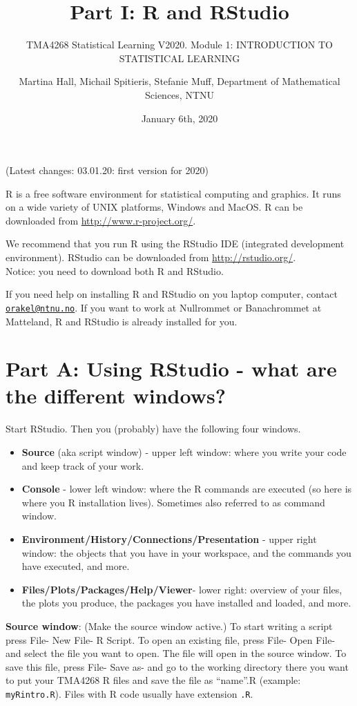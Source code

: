 \documentclass[]{article}
\title{Part I: R and RStudio}
\subtitle{TMA4268 Statistical Learning V2020. Module 1: INTRODUCTION TO
STATISTICAL LEARNING}
\author{Martina Hall, Michail Spitieris, Stefanie Muff, Department of
Mathematical Sciences, NTNU}
\date{January 6th, 2020}
\begin{document}
\maketitle

(Latest changes: 03.01.20: first version for 2020)

R is a free software environment for statistical computing and graphics.
It runs on a wide variety of UNIX platforms, Windows and MacOS. R can be
downloaded from \url{http://www.r-project.org/}.

We recommend that you run R using the RStudio IDE (integrated
development environment). RStudio can be downloaded from
\url{http://rstudio.org/}.\\
Notice: you need to download both R and RStudio.

If you need help on installing R and RStudio on you laptop computer,
contact \href{mailto:orakel@ntnu.no}{\nolinkurl{orakel@ntnu.no}}. If you
want to work at Nullrommet or Banachrommet at Matteland, R and RStudio
is already installed for you.

\section{Part A: Using RStudio - what are the different
windows?}\label{part-a-using-rstudio---what-are-the-different-windows}

Start RStudio. Then you (probably) have the following four windows.

\begin{itemize}
\item
  \textbf{Source} (aka script window) - upper left window: where you
  write your code and keep track of your work.
\item
  \textbf{Console} - lower left window: where the R commands are
  executed (so here is where you R installation lives). Sometimes also
  referred to as command window.
\item
  \textbf{Environment/History/Connections/Presentation} - upper right
  window: the objects that you have in your workspace, and the commands
  you have executed, and more.
\item
  \textbf{Files/Plots/Packages/Help/Viewer}- lower right: overview of
  your files, the plots you produce, the packages you have installed and
  loaded, and more.
\end{itemize}

\textbf{Source window}: (Make the source window active.) To start
writing a script press File- New File- R Script. To open an existing
file, press File- Open File- and select the file you want to open. The
file will open in the source window. To save this file, press File- Save
as- and go to the working directory there you want to put your TMA4268 R
files and save the file as ``name''.R (example: \texttt{myRintro.R}).
Files with R code usually have extension \texttt{.R}.
\end{document}
